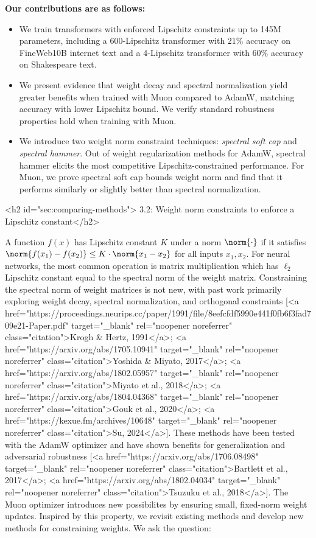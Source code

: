 \vspace{1em}

\textbf{Our contributions are as follows:}
\begin{itemize}
    \item We train transformers with enforced Lipschitz constraints up to 145M parameters, including a 600-Lipschitz transformer with 21\% accuracy on FineWeb10B internet text and a 4-Lipschitz transformer with 60\% accuracy on Shakespeare text.
    \item We present evidence that weight decay and spectral normalization yield greater benefits when trained with Muon compared to AdamW, matching accuracy with lower Lipschitz bound. We verify standard robustness properties hold when training with Muon.
    \item We introduce two weight norm constraint techniques: \textit{spectral soft cap} and \textit{spectral hammer}. Out of weight regularization methods for AdamW, spectral hammer elicits the most competitive Lipschitz-constrained performance. For Muon, we prove spectral soft cap bounds weight norm and find that it performs similarly or slightly better than spectral normalization. 
\end{itemize}


<h2 id="sec:comparing-methods"> 3.2: Weight norm constraints to enforce a Lipschitz constant</h2>

A function $f(x)$ has Lipschitz constant $K$ under a norm $\norm{\cdot}$ if it satisfies $\norm{f(x_1) - f(x_2)} \leq K \cdot \norm{x_1 - x_2}$ for all inputs $x_1, x_2$. For neural networks, the most common operation is matrix multiplication which has $\ell_2$ Lipschitz constant equal to the spectral norm of the weight matrix. Constraining the spectral norm of weight matrices is not new, with past work primarily exploring weight decay, spectral normalization, and orthogonal constraints [<a href="https://proceedings.neurips.cc/paper/1991/file/8eefcfdf5990e441f0fb6f3fad709e21-Paper.pdf" target="_blank" rel="noopener noreferrer" class="citation">Krogh & Hertz, 1991</a>; <a href="https://arxiv.org/abs/1705.10941" target="_blank" rel="noopener noreferrer" class="citation">Yoshida & Miyato, 2017</a>; <a href="https://arxiv.org/abs/1802.05957" target="_blank" rel="noopener noreferrer" class="citation">Miyato et al., 2018</a>; <a href="https://arxiv.org/abs/1804.04368" target="_blank" rel="noopener noreferrer" class="citation">Gouk et al., 2020</a>; <a href="https://kexue.fm/archives/10648" target="_blank" rel="noopener noreferrer" class="citation">Su, 2024</a>]. These methods have been tested with the AdamW optimizer and have shown benefits for generalization and adversarial robustness [<a href="https://arxiv.org/abs/1706.08498" target="_blank" rel="noopener noreferrer" class="citation">Bartlett et al., 2017</a>; <a href="https://arxiv.org/abs/1802.04034" target="_blank" rel="noopener noreferrer" class="citation">Tsuzuku et al., 2018</a>]. The Muon optimizer introduces new possibilites by ensuring small, fixed-norm weight updates. Inspired by this property, we revisit existing methods and develop new methods for constraining weights. We ask the question:

